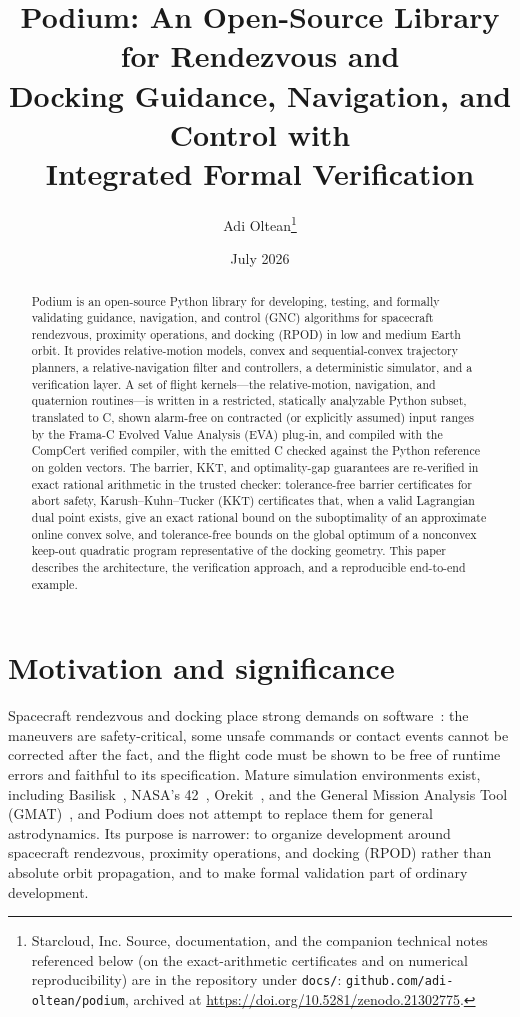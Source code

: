 \documentclass[11pt]{article}
\title{Podium: An Open-Source Library for Rendezvous and\\
Docking Guidance, Navigation, and Control with\\
Integrated Formal Verification}
\author{Adi Oltean\thanks{Starcloud, Inc. Source, documentation, and the companion
technical notes referenced below (on the exact-arithmetic certificates and on
numerical reproducibility) are in the repository under \texttt{docs/}:
\texttt{github.com/adi-oltean/podium}, archived at
\url{https://doi.org/10.5281/zenodo.21302775}.}}
\date{July 2026}
\begin{document}
\maketitle

\begin{abstract}
Podium is an open-source Python library for developing, testing, and formally
validating guidance, navigation, and control (GNC) algorithms for spacecraft
rendezvous, proximity operations, and docking (RPOD) in low and medium Earth
orbit. It provides relative-motion models, convex and sequential-convex
trajectory planners, a relative-navigation filter and controllers, a
deterministic simulator, and a verification layer. A set of flight kernels---the
relative-motion, navigation, and quaternion routines---is
written in a restricted, statically analyzable Python subset, translated to
C, shown alarm-free on contracted (or explicitly assumed) input ranges by the
Frama-C Evolved Value Analysis (EVA) plug-in, and
compiled with the CompCert verified compiler, with the
emitted C checked against the Python reference on golden vectors. The barrier, KKT, and optimality-gap guarantees are re-verified
in exact rational arithmetic in the trusted checker: tolerance-free barrier
certificates for abort safety, Karush--Kuhn--Tucker (KKT) certificates that, when
a valid Lagrangian dual point exists, give an exact rational bound on the
suboptimality of an approximate online convex solve, and tolerance-free bounds on
the global optimum of a nonconvex keep-out quadratic program representative of the
docking geometry. This paper describes the architecture, the
verification approach, and a reproducible end-to-end example.
\end{abstract}

\section{Motivation and significance}

Spacecraft rendezvous and docking place strong demands on
software~\cite{fehse2003}: the maneuvers
are safety-critical, some unsafe commands or contact events cannot be
corrected after the fact, and the flight code must be shown to be free
of runtime errors and faithful to its specification. Mature simulation
environments exist, including Basilisk~\cite{basilisk2020}, NASA's 42~\cite{nasa42}, Orekit~\cite{orekit2010}, and the General Mission Analysis Tool
(GMAT)~\cite{gmat2020}, and Podium
does not attempt to replace them for general astrodynamics. Its purpose is
narrower: to organize development around spacecraft rendezvous, proximity
operations, and docking (RPOD) rather than absolute orbit propagation, and to
make formal validation part of ordinary development.
\end{document}
